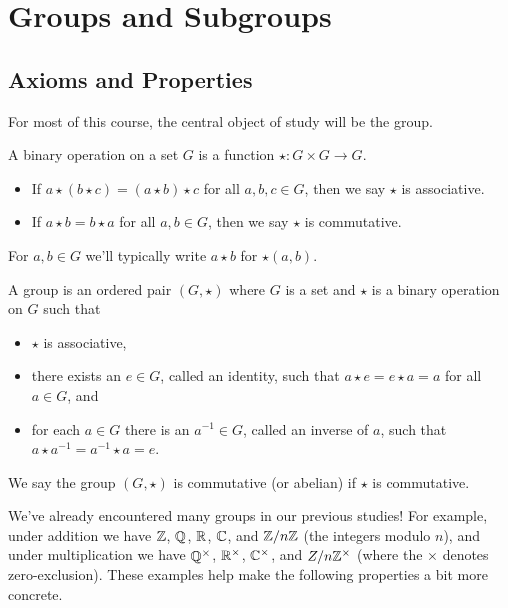 \documentclass[../m171main.tex]{subfiles}
\begin{document}
\chapter{Groups and Subgroups}
\section{Axioms and Properties}
For most of this course, the central object of study will be the group.

\begin{definition}
    A binary operation on a set $G$ is a function $\star : G \times G \to G$.
    \begin{itemize}
        \item If $a \star (b \star c) = (a \star b) \star c$ for all $a,b,c \in G$, then we say $\star$ is associative.
        \item If $a \star b = b \star a$ for all $a,b \in G$, then we say $\star$ is commutative.
    \end{itemize}
    For $a,b \in G$ we'll typically write $a \star b$ for $\star (a,b)$.
\end{definition}

\begin{definition}[Group]
    A group is an ordered pair $(G, \star)$ where $G$ is a set and $\star$ is a binary operation on $G$ such that
    \begin{itemize}
        \item $\star$ is associative,
        \item there exists an $e \in G$, called an identity, such that $a \star e = e \star a = a$ for all $a \in G$, and
        \item for each $a \in G$ there is an $a^{-1} \in G$, called an inverse of $a$, such that $a \star a^{-1} = a^{-1} \star a = e$.
    \end{itemize}
    We say the group $(G, \star)$ is commutative (or abelian) if $\star$ is commutative.
\end{definition}

We've already encountered many groups in our previous studies!
For example, under addition we have $\mathbb{Z}$, $\mathbb{Q}$, $\mathbb{R}$, $\mathbb{C}$, and $\mathbb{Z} / n\mathbb{Z}$ (the integers modulo $n$), and under multiplication we have $\mathbb{Q}^\times$, $\mathbb{R}^\times$, $\mathbb{C}^\times$, and $Z / n\mathbb{Z}^\times$ (where the $\times$ denotes zero-exclusion).
These examples help make the following properties a bit more concrete.
\end{document}
